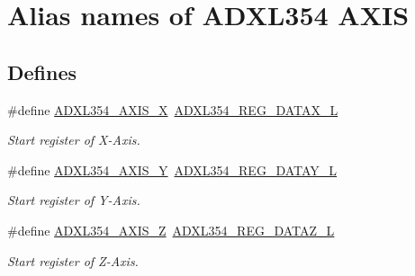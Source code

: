 \hypertarget{group___a_d_x_l354___a_x_i_s}{\section{\-Alias names of \-A\-D\-X\-L354 \-A\-X\-I\-S}
\label{group___a_d_x_l354___a_x_i_s}
}
\subsection*{\-Defines}
\begin{DoxyCompactItemize}
\item 
\hypertarget{group___a_d_x_l354___a_x_i_s_gaa6b505b3acdf0fd830c97050220e03ef}{\#define \hyperlink{group___a_d_x_l354___a_x_i_s_gaa6b505b3acdf0fd830c97050220e03ef}{\-A\-D\-X\-L354\-\_\-\-A\-X\-I\-S\-\_\-\-X}~\hyperlink{group___a_d_x_l354___r_e_g_i_s_t_e_r_s_ga7c3173b923eeaf75f61f0a261a3cd407}{\-A\-D\-X\-L354\-\_\-\-R\-E\-G\-\_\-\-D\-A\-T\-A\-X\-\_\-\-L}}\label{group___a_d_x_l354___a_x_i_s_gaa6b505b3acdf0fd830c97050220e03ef}

\begin{DoxyCompactList}\small\item\em \-Start register of \-X-\/\-Axis. \end{DoxyCompactList}\item 
\hypertarget{group___a_d_x_l354___a_x_i_s_ga110e1234898b51eccbcec4ff024e546e}{\#define \hyperlink{group___a_d_x_l354___a_x_i_s_ga110e1234898b51eccbcec4ff024e546e}{\-A\-D\-X\-L354\-\_\-\-A\-X\-I\-S\-\_\-\-Y}~\hyperlink{group___a_d_x_l354___r_e_g_i_s_t_e_r_s_ga04137c170f870f5c03540c4b4dcd51cf}{\-A\-D\-X\-L354\-\_\-\-R\-E\-G\-\_\-\-D\-A\-T\-A\-Y\-\_\-\-L}}\label{group___a_d_x_l354___a_x_i_s_ga110e1234898b51eccbcec4ff024e546e}

\begin{DoxyCompactList}\small\item\em \-Start register of \-Y-\/\-Axis. \end{DoxyCompactList}\item 
\hypertarget{group___a_d_x_l354___a_x_i_s_ga30d308af2964af6d41132580f6f87b4c}{\#define \hyperlink{group___a_d_x_l354___a_x_i_s_ga30d308af2964af6d41132580f6f87b4c}{\-A\-D\-X\-L354\-\_\-\-A\-X\-I\-S\-\_\-\-Z}~\hyperlink{group___a_d_x_l354___r_e_g_i_s_t_e_r_s_ga0daae6c5d86f95e220a46151059b9257}{\-A\-D\-X\-L354\-\_\-\-R\-E\-G\-\_\-\-D\-A\-T\-A\-Z\-\_\-\-L}}\label{group___a_d_x_l354___a_x_i_s_ga30d308af2964af6d41132580f6f87b4c}

\begin{DoxyCompactList}\small\item\em \-Start register of \-Z-\/\-Axis. \end{DoxyCompactList}\end{DoxyCompactItemize}
